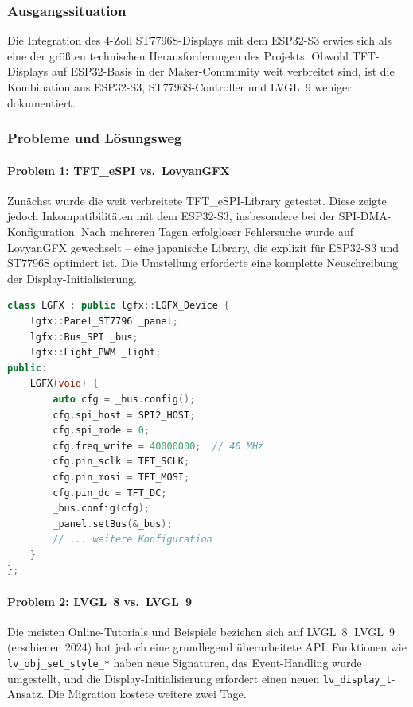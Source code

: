 \subsubsection{Ausgangssituation}

Die Integration des 4-Zoll ST7796S-Displays mit dem ESP32-S3 erwies sich als eine der größten technischen Herausforderungen des Projekts. Obwohl TFT-Displays auf ESP32-Basis in der Maker-Community weit verbreitet sind, ist die Kombination aus ESP32-S3, ST7796S-Controller und LVGL~9 weniger dokumentiert.

\subsubsection{Probleme und Lösungsweg}

\paragraph{Problem 1: TFT\_eSPI vs.\ LovyanGFX}
Zunächst wurde die weit verbreitete TFT\_eSPI-Library getestet. Diese zeigte jedoch Inkompatibilitäten mit dem ESP32-S3, insbesondere bei der SPI-DMA-Konfiguration. Nach mehreren Tagen erfolgloser Fehlersuche wurde auf LovyanGFX gewechselt -- eine japanische Library, die explizit für ESP32-S3 und ST7796S optimiert ist. Die Umstellung erforderte eine komplette Neuschreibung der Display-Initialisierung.

\begin{lstlisting}[language=C++,caption={LovyanGFX Konfiguration für ST7796S},label={lst:lgfx_config}]
class LGFX : public lgfx::LGFX_Device {
    lgfx::Panel_ST7796 _panel;
    lgfx::Bus_SPI _bus;
    lgfx::Light_PWM _light;
public:
    LGFX(void) {
        auto cfg = _bus.config();
        cfg.spi_host = SPI2_HOST;
        cfg.spi_mode = 0;
        cfg.freq_write = 40000000;  // 40 MHz
        cfg.pin_sclk = TFT_SCLK;
        cfg.pin_mosi = TFT_MOSI;
        cfg.pin_dc = TFT_DC;
        _bus.config(cfg);
        _panel.setBus(&_bus);
        // ... weitere Konfiguration
    }
};
\end{lstlisting}

\paragraph{Problem 2: LVGL~8 vs.\ LVGL~9}
Die meisten Online-Tutorials und Beispiele beziehen sich auf LVGL~8. LVGL~9 (erschienen 2024) hat jedoch eine grundlegend überarbeitete API. Funktionen wie \texttt{lv\_obj\_set\_style\_*} haben neue Signaturen, das Event-Handling wurde umgestellt, und die Display-Initialisierung erfordert einen neuen \texttt{lv\_display\_t}-Ansatz. Die Migration kostete weitere zwei Tage.

